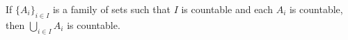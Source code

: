 If \(\{A_i\}_{i \in I}\) is a family of sets such that \(I\) is countable and each \(A_i\) is countable, then \(\bigcup_{i \in I} A_i\) is countable.